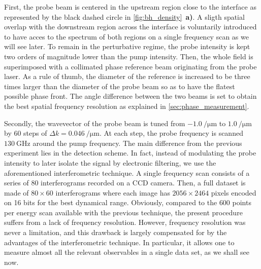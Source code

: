 First, the probe beam is centered in the upstream region close to the interface as represented by the black dashed circle in \autoref{fig:bh_density}~\textbf{a)}.
A sligth spatial overlap with the downstream region across the interface is voluntarily introduced to have acces to the spectrum of both regions on a single frequency scan as we will see later. To remain in 
the perturbative regime, the probe intensity is kept two orders of magnitude lower than the pump intensity.
Then, the whole field is superimposed with a collimated phase reference beam originating from the probe laser. As a rule of thumb, the diameter of the reference is increased to be three times larger than the diameter of the probe beam so as to have the flatest possible phase front.
 The angle difference between the two beams is set to obtain the best spatial frequency resolution as explained in \autoref{sec:phase_measurement}.


Secondly, the wavevector of the probe beam is tuned from $\SI{-1.0}{\per \micro \meter}$ to $\SI{1.0}{\per \micro \meter}$ by 60 steps of $\Delta k =\SI{0.046}{\per \micro \meter}$.
At each step, the probe frequency is scanned $\SI{130}{\giga \hertz}$ around the pump frequency. The main difference from the previous experiment lies in the detection scheme. In fact, instead of modulating the probe intensity to later isolate the signal by electronic filtering, we use the aforementioned interferometric technique. A single frequency scan consists of a series of 80 interferograms recorded on a CCD camera. Then, a full dataset is made of $80\times 60$ interferograms where each image has $2056\times 2464$ pixels encoded on 16 bits
for the best dynamical range. Obviously, compared to the $600$ points per energy scan available with the previous technique,
the present procedure suffers from a lack of frequency resolution. However, frequency resolution was never a limitation, and this drawback
is largely compensated for by the advantages of the interferometric technique. In particular, it allows one to measure almost all the relevant observables in a single data set, as we shall see now. 

